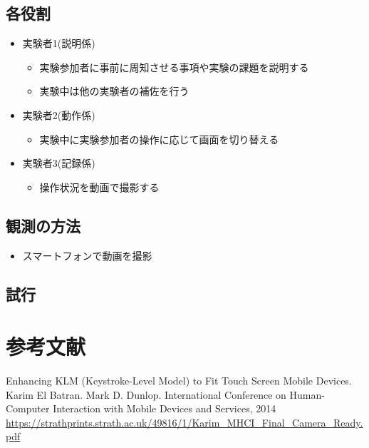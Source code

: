 \documentclass[12pt,a4paper,dvipdf]{jsarticle}
\begin{document}
\subsection{各役割}
\begin{itemize}
    \item 実験者1(説明係)
          \begin{itemize}
              \item 実験参加者に事前に周知させる事項や実験の課題を説明する
              \item 実験中は他の実験者の補佐を行う
          \end{itemize}
    \item 実験者2(動作係)
          \begin{itemize}
              \item 実験中に実験参加者の操作に応じて画面を切り替える
          \end{itemize}
    \item 実験者3(記録係)
          \begin{itemize}
              \item 操作状況を動画で撮影する
          \end{itemize}
\end{itemize}
\subsection{観測の方法}
\begin{itemize}
    \item スマートフォンで動画を撮影
\end{itemize}
\subsection{試行}
\section{参考文献}
Enhancing KLM (Keystroke-Level Model) to Fit Touch Screen Mobile Devices. Karim El Batran. Mark D. Dunlop. International Conference on Human-Computer Interaction with Mobile Devices and Services, 2014 \\
\url{https://strathprints.strath.ac.uk/49816/1/Karim_MHCI_Final_Camera_Ready.pdf}
\end{document}
